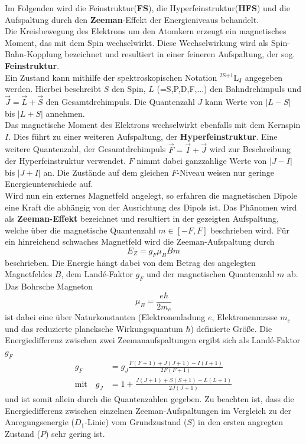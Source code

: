 Im Folgenden wird die Feinstruktur(\textbf{FS}), die Hyperfeinstruktur(\textbf{HFS}) und die Aufspaltung durch den \textbf{Zeeman}-Effekt der Energieniveaus behandelt.
\\
Die Kreisbewegung des Elektrons um den Atomkern erzeugt ein magnetisches Moment, das mit dem Spin wechselwirkt.
Diese Wechselwirkung wird als Spin-Bahn-Kopplung bezeichnet und resultiert in einer feineren Aufspaltung, der sog. \textbf{Feinstruktur}.
\\
Ein Zustand kann mithilfe der spektroskopischen Notation $^\text{2S+1}\text{L}_\text{J}$ angegeben werden.
Hierbei beschreibt $S$ den Spin, $L$ (=S,P,D,F,...) den Bahndrehimpuls und $\vec{J} = \vec{L} + \vec{S}$ den Gesamtdrehimpuls.
Die Quantenzahl $J$ kann Werte von $|L-S|$ bis $|L+S|$ annehmen.
\\
Das magnetische Moment des Elektrons wechselwirkt ebenfalls mit dem Kernspin $I$.
Dies führt zu einer weiteren Aufspaltung, der \textbf{Hyperfeinstruktur}.
Eine weitere Quantenzahl, der Gesamtdrehimpuls $\vec{F} = \vec{I} + \vec{J}$ wird zur Beschreibung der Hyperfeinstruktur verwendet.
$F$ nimmt dabei ganzzahlige Werte von $|J-I|$ bis $|J+I|$ an.
Die Zustände auf dem gleichen $F$-Niveau weisen nur geringe Energieunterschiede auf.
\\
Wird nun ein externes Magnetfeld angelegt, so erfahren die magnetischen Dipole eine Kraft die abhängig von der Ausrichtung des Dipols ist.
Das Phänomen wird als \textbf{Zeeman-Effekt} bezeichnet und resultiert in der gezeigten Aufspaltung, welche über die magnetische Quantenzahl $m \in [-F, F]$ beschrieben wird.
Für ein hinreichend schwaches Magnetfeld wird die Zeeman-Aufspaltung durch
\begin{equation}
    E_Z = g_F \mu_B B m
    \label{eqn:zeeman_1}
\end{equation}
beschrieben.
Die Energie hängt dabei von dem Betrag des angelegten Magnetfeldes $B$, dem Landé-Faktor $g_F$ und der magnetischen Quantenzahl $m$ ab.
Das Bohrsche Magneton
\begin{equation}
    \mu_B = \frac{e \hbar}{2 m_e}
\end{equation}
ist dabei eine über Naturkonstanten (Elektronenladung $e$, Elektronenmasse $m_e$ und das reduzierte plancksche Wirkungsquantum $\hbar$) definierte Größe.
Die Energiedifferenz zwischen zwei Zeemanaufspaltungen ergibt sich als Landé-Faktor $g_F$
\begin{align}
    g_F &= g_J \frac{F(F+1) + J(J+1) - I(I+1)}{2F(F+1)} \label{eqn:g_F} \\
    \text{mit} \quad g_J &= 1 + \frac{J(J+1) + S(S+1) - L(L+1)}{2J(J+1)} \label{eqn:g_J}
\end{align}
und ist somit allein durch die Quantenzahlen gegeben.
Zu beachten ist, dass die Energiedifferenz zwischen einzelnen Zeeman-Aufspaltungen im Vergleich zu der Anregungsenergie ($D_1$-Linie) vom Grundzustand ($S$) in den ersten angregten Zustand ($P$) sehr gering ist.
\FloatBarrier

